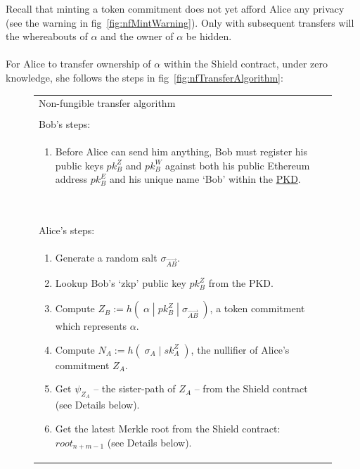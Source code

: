 \documentclass{article}
\newcounter{ongoingEnumCounter}%
\begin{document}
\noindent
Recall that minting a token commitment does not yet afford Alice any privacy (see the warning in fig~\ref{fig:nfMintWarning}). Only with subsequent transfers will the whereabouts of $\alpha$ and the owner of $\alpha$ be hidden.\\
\\




For Alice to transfer ownership of $\alpha$ within the Shield contract, under zero knowledge, she follows the steps in fig~\ref{fig:nfTransferAlgorithm}:

\newpage
\begin{figure}[H]
  \ContinuedFloat*
	\begin{center}
		\begin{framed}
      \begin{tabular}{p{16cm}}
        Non-fungible transfer algorithm \\
        \\
        \hline
        Bob's steps:\\
        \begin{enumerate}
          \item Before Alice can send him anything, Bob must register his public keys $pk_B^Z$ and $pk_B^W$ against both his public Ethereum address $pk_B^E$ and his unique name `Bob' within the \hyperref[sec:pkd]{PKD}.
          \setcounter{ongoingEnumCounter}{\value{enumi}}
        \end{enumerate}
        \ \\
        \hline
        Alice's steps:\\
        \begin{enumerate}
          \setcounter{enumi}{\value{ongoingEnumCounter}}
          \item Generate a random salt $\sigma_{\vec{AB}}$.
          \item Lookup Bob's `zkp' public key $pk_B^Z$ from the PKD.
          \item Compute $Z_B := h(\;\alpha\;|\;pk^Z_B\;|\;\sigma_{\vec{AB}}\;)$, a token commitment which represents $\alpha$.
          \item Compute $N_A := h(\;\sigma_{A}\;|\;sk^Z_A\;)$, the nullifier of Alice's commitment $Z_A$.
          \item Get $\psi_{Z_A}$ -- the sister-path of $Z_A$ -- from the Shield contract (see Details below).
          \item Get the latest Merkle root from the Shield contract: $root_{n+m-1}$ (see Details below).

\end{enumerate}
\end{tabular}
\end{framed}
\end{center}
\end{figure}
\end{document}

